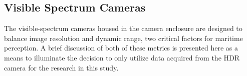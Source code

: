 \documentclass{erauthesis}
\begin{document}











\subsection{Visible Spectrum Cameras} \label{visual_cameras}

The visible-spectrum cameras housed in the camera enclosure are designed to balance image resolution and dynamic range, two critical factors for maritime perception.
A brief discussion of both of these metrics is presented here as a means to illuminate the decision to only utilize data acquired from the \ac{HDR} camera for the research in this study.
\end{document}
